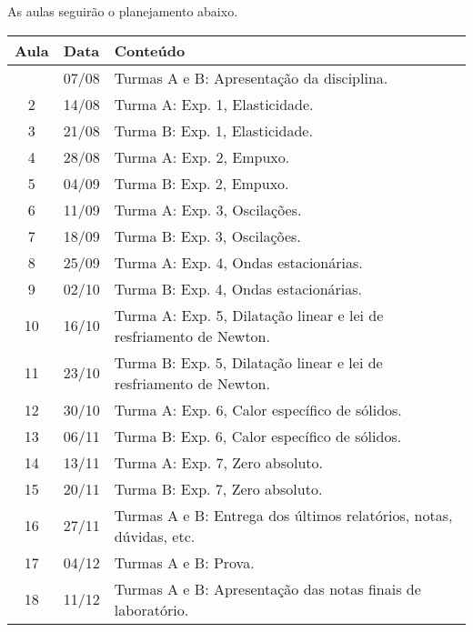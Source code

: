 As aulas seguirão o planejamento abaixo.
\begin{center}
\begin{longtable}{ccp{70mm}}
\toprule
Aula & Data & Conteúdo \\
\midrule
\endhead
\bottomrule
\endfoot
1 & 07/08 & Turmas A e B: Apresentação da disciplina. \\
2 & 14/08 & Turma A: Exp. 1, Elasticidade. \\
3 & 21/08 & Turma B: Exp. 1, Elasticidade. \\
4 & 28/08 & Turma A: Exp. 2, Empuxo. \\
5 & 04/09 & Turma B: Exp. 2, Empuxo. \\
6 & 11/09 & Turma A: Exp. 3, Oscilações. \\
7 & 18/09 & Turma B: Exp. 3, Oscilações. \\
8 & 25/09 & Turma A: Exp. 4, Ondas estacionárias. \\
9 & 02/10 & Turma B: Exp. 4, Ondas estacionárias. \\
10 & 16/10 & Turma A: Exp. 5, Dilatação linear e lei de resfriamento de Newton. \\
11 & 23/10 & Turma B: Exp. 5, Dilatação linear e lei de resfriamento de Newton. \\
12 & 30/10 & Turma A: Exp. 6, Calor específico de sólidos. \\
13 & 06/11 & Turma B: Exp. 6, Calor específico de sólidos. \\
14 & 13/11 & Turma A: Exp. 7, Zero absoluto. \\
15 & 20/11 & Turma B: Exp. 7, Zero absoluto. \\
16 & 27/11 & Turmas A e B: Entrega dos últimos relatórios, notas, dúvidas, etc.  \\
17 & 04/12 & Turmas A e B: Prova. \\
18 & 11/12 & Turmas A e B: Apresentação das notas finais de laboratório.
\end{longtable}
\end{center}
\cleardoublepage
